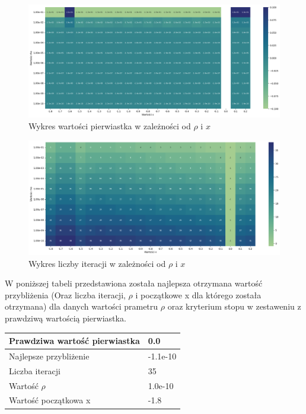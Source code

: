 \documentclass{article}
\begin{document}
\begin{figure}[H]
  \centering
  \begin{minipage}[b]{\textwidth}
    \includegraphics[width=\textwidth]{heatmap05.png}
    \caption{Wykres wartości pierwiastka w zależności od \(\rho\) i \(x\)}
  \end{minipage}
\end{figure}

\begin{figure}[H]
  \centering
  \begin{minipage}[b]{\textwidth}
    \includegraphics[width=\textwidth]{heatmap06.png}
  \end{minipage}
  \caption{Wykres liczby iteracji w zależności od \(\rho\) i \(x\)}
\end{figure}

\noindent
W poniższej tabeli przedstawiona została najlepsza otrzymana wartość przybliżenia (Oraz liczba iteracji, \(\rho\) i początkowe x dla którego została otrzymana) dla danych wartości prametru \(\rho\) oraz kryterium stopu w zestaweniu z prawdziwą wartością pierwiastka.

\begin{table}[H]
    \centering
    \begin{tabular}{|l|l|}
    \hline
        Prawdziwa wartość pierwiastka & 0.0 \\ \hline
        Najlepsze przybliżenie & -1.1e-10 \\ \hline
        Liczba iteracji & 35 \\ \hline
        Wartość $\rho$ & 1.0e-10 \\ \hline
        Wartość początkowa x & -1.8 \\ \hline
    \end{tabular}
\end{table}
\end{document}
